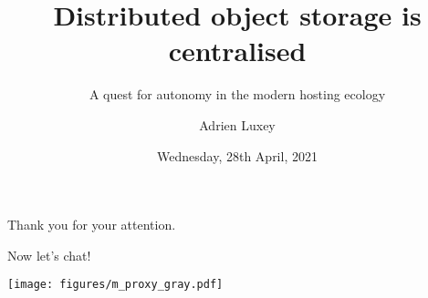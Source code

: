 \documentclass[compress]{beamer}
\title{Distributed object storage is centralised}
\subtitle{A quest for autonomy in the modern hosting ecology}
\author{Adrien Luxey}
\date{Wednesday, 28th April, 2021}
\begin{document}
{
\begin{frame}
\titlepage
\end{frame}
}











{
\begin{frame}
\centering

\vspace{1cm}
\Large Thank you for your attention.

\vspace{2cm}
\large Now let's chat!

\vspace{1cm}
\raggedleft
\texttt{[image: figures/m\_proxy\_gray.pdf]}
\end{frame}
}


% 
% 
% 
\end{document}
